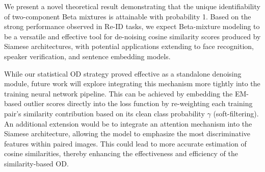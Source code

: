 \documentclass[lettersize,journal]{IEEEtran}
\begin{document}
We present a novel theoretical result demonstrating that the unique identifiability of two-component Beta mixtures is attainable with probability 1. 
Based on the strong performance observed in Re-ID tasks, we expect Beta-mixture modeling to be a versatile and effective tool for de-noising cosine similarity scores produced by Siamese architectures, with potential applications extending to face recognition, speaker verification, and sentence embedding models.

While our statistical OD strategy proved effective as a standalone denoising module, future work will explore integrating this mechanism more tightly into the training neural network pipeline. This can be achieved by embedding the EM-based outlier scores directly into the loss function by re-weighting each training pair's similarity contribution based on its clean class probability $\gamma$ (soft-filtering). 
An additional extension would be to integrate an attention mechanism into the Siamese architecture, allowing the model to emphasize the most discriminative features within paired images. This could lead to more accurate estimation of cosine similarities, thereby enhancing the effectiveness and efficiency of the similarity-based OD.



\end{document}
